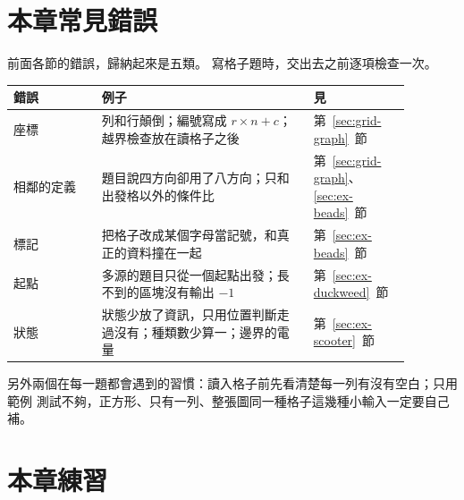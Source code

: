 \section{本章常見錯誤}
\label{sec:grid-pitfalls}

前面各節的錯誤，歸納起來是五類。 寫格子題時，交出去之前逐項檢查一次。

\begin{center}
\begin{tabular}{p{0.2\linewidth}p{0.48\linewidth}p{0.2\linewidth}}
\toprule
錯誤 & 例子 & 見 \\
\midrule
座標 & 列和行顛倒；編號寫成 $r \times n + c$；越界檢查放在讀格子之後 &
第~\ref{sec:grid-graph}~節 \\
相鄰的定義 & 題目說四方向卻用了八方向；只和出發格以外的條件比 &
第~\ref{sec:grid-graph}、\ref{sec:ex-beads}~節 \\
標記 & 把格子改成某個字母當記號，和真正的資料撞在一起 &
第~\ref{sec:ex-beads}~節 \\
起點 & 多源的題目只從一個起點出發；長不到的區塊沒有輸出 $-1$ &
第~\ref{sec:ex-duckweed}~節 \\
狀態 & 狀態少放了資訊，只用位置判斷走過沒有；種類數少算一；邊界的電量 &
第~\ref{sec:ex-scooter}~節 \\
\bottomrule
\end{tabular}
\end{center}

另外兩個在每一題都會遇到的習慣：讀入格子前先看清楚每一列有沒有空白；只用範例
測試不夠，正方形、只有一列、整張圖同一種格子這幾種小輸入一定要自己補。

\section{本章練習}
\label{sec:ch12-exercises}


